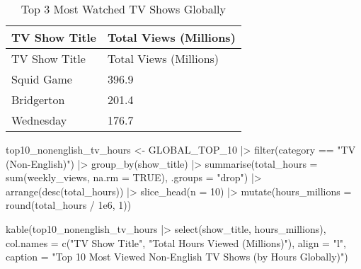 \documentclass[
  12pt,
  letterpaper,
  DIV=11,
  numbers=noendperiod]{scrartcl}
\newenvironment{Shaded}{\begin{snugshade}}{\end{snugshade}}
\newcommand{\AttributeTok}[1]{\textcolor[rgb]{0.40,0.45,0.13}{#1}}
\newcommand{\ConstantTok}[1]{\textcolor[rgb]{0.56,0.35,0.01}{#1}}
\newcommand{\DecValTok}[1]{\textcolor[rgb]{0.68,0.00,0.00}{#1}}
\newcommand{\FloatTok}[1]{\textcolor[rgb]{0.68,0.00,0.00}{#1}}
\newcommand{\FunctionTok}[1]{\textcolor[rgb]{0.28,0.35,0.67}{#1}}
\newcommand{\NormalTok}[1]{\textcolor[rgb]{0.00,0.23,0.31}{#1}}
\newcommand{\OtherTok}[1]{\textcolor[rgb]{0.00,0.23,0.31}{#1}}
\newcommand{\SpecialCharTok}[1]{\textcolor[rgb]{0.37,0.37,0.37}{#1}}
\newcommand{\StringTok}[1]{\textcolor[rgb]{0.13,0.47,0.30}{#1}}
\begin{document}
\begin{longtable}[]{@{}ll@{}}
\caption{Top 3 Most Watched TV Shows Globally}\tabularnewline
\toprule\noalign{}
TV Show Title & Total Views (Millions) \\
\midrule\noalign{}
\endfirsthead
\toprule\noalign{}
TV Show Title & Total Views (Millions) \\
\midrule\noalign{}
\endhead
\bottomrule\noalign{}
\endlastfoot
Squid Game & 396.9 \\
Bridgerton & 201.4 \\
Wednesday & 176.7 \\
\end{longtable}

\begin{Shaded}
\begin{Highlighting}[]
\NormalTok{top10\_nonenglish\_tv\_hours }\OtherTok{\textless{}{-}}\NormalTok{ GLOBAL\_TOP\_10 }\SpecialCharTok{|\textgreater{}}
  \FunctionTok{filter}\NormalTok{(category }\SpecialCharTok{==} \StringTok{"TV (Non{-}English)"}\NormalTok{) }\SpecialCharTok{|\textgreater{}}
  \FunctionTok{group\_by}\NormalTok{(show\_title) }\SpecialCharTok{|\textgreater{}}
  \FunctionTok{summarise}\NormalTok{(}\AttributeTok{total\_hours =} \FunctionTok{sum}\NormalTok{(weekly\_views, }\AttributeTok{na.rm =} \ConstantTok{TRUE}\NormalTok{), }\AttributeTok{.groups =} \StringTok{"drop"}\NormalTok{) }\SpecialCharTok{|\textgreater{}}
  \FunctionTok{arrange}\NormalTok{(}\FunctionTok{desc}\NormalTok{(total\_hours)) }\SpecialCharTok{|\textgreater{}}
  \FunctionTok{slice\_head}\NormalTok{(}\AttributeTok{n =} \DecValTok{10}\NormalTok{) }\SpecialCharTok{|\textgreater{}}
  \FunctionTok{mutate}\NormalTok{(}\AttributeTok{hours\_millions =} \FunctionTok{round}\NormalTok{(total\_hours }\SpecialCharTok{/} \FloatTok{1e6}\NormalTok{, }\DecValTok{1}\NormalTok{))}

\FunctionTok{kable}\NormalTok{(top10\_nonenglish\_tv\_hours }\SpecialCharTok{|\textgreater{}} \FunctionTok{select}\NormalTok{(show\_title, hours\_millions),}
      \AttributeTok{col.names =} \FunctionTok{c}\NormalTok{(}\StringTok{"TV Show Title"}\NormalTok{, }\StringTok{"Total Hours Viewed (Millions)"}\NormalTok{),}
      \AttributeTok{align =} \StringTok{"l"}\NormalTok{,}
      \AttributeTok{caption =} \StringTok{"Top 10 Most Viewed Non{-}English TV Shows (by Hours Globally)"}\NormalTok{)}
\end{Highlighting}
\end{Shaded}
\end{document}
